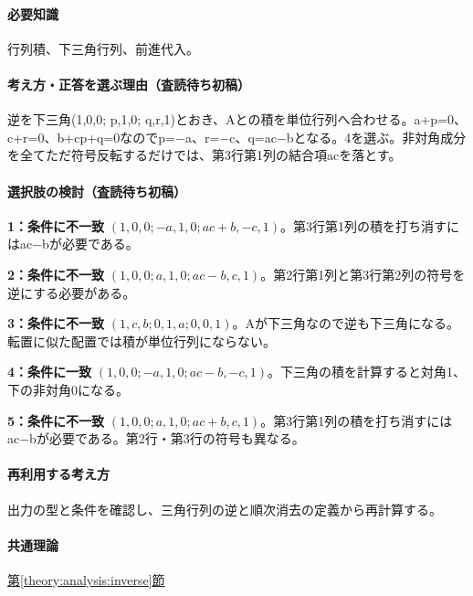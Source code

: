 \paragraph{必要知識} 行列積、下三角行列、前進代入。

\paragraph{考え方・正答を選ぶ理由（査読待ち初稿）} 逆を下三角(1,0,0; p,1,0; q,r,1)とおき、Aとの積を単位行列へ合わせる。a+p=\allowbreak{}0、c+r=\allowbreak{}0、b+cp+q=\allowbreak{}0なのでp=−a、r=−c、q=\allowbreak{}ac−bとなる。4を選ぶ。非対角成分を全てただ符号反転するだけでは、第3行第1列の結合項acを落とす。

\paragraph{選択肢の検討（査読待ち初稿）}\mbox{}\par

\noindent\textbf{1：条件に不一致} \((1,0,0;-a,1,0;ac+b,-c,1)\)。第3行第1列の積を打ち消すにはac−bが必要である。\par

\noindent\textbf{2：条件に不一致} \((1,0,0;a,1,0;ac-b,c,1)\)。第2行第1列と第3行第2列の符号を逆にする必要がある。\par

\noindent\textbf{3：条件に不一致} \((1,c,b;0,1,a;0,0,1)\)。Aが下三角なので逆も下三角になる。転置に似た配置では積が単位行列にならない。\par

\noindent\textbf{4：条件に一致} \((1,0,0;-a,1,0;ac-b,-c,1)\)。下三角の積を計算すると対角1、下の非対角0になる。\par

\noindent\textbf{5：条件に不一致} \((1,0,0;a,1,0;ac+b,c,1)\)。第3行第1列の積を打ち消すにはac−bが必要である。第2行・第3行の符号も異なる。\par

\paragraph{再利用する考え方} 出力の型と条件を確認し、三角行列の逆と順次消去の定義から再計算する。

\paragraph{共通理論} \hyperref[theory:analysis:inverse]{第\ref*{theory:analysis:inverse}節}

